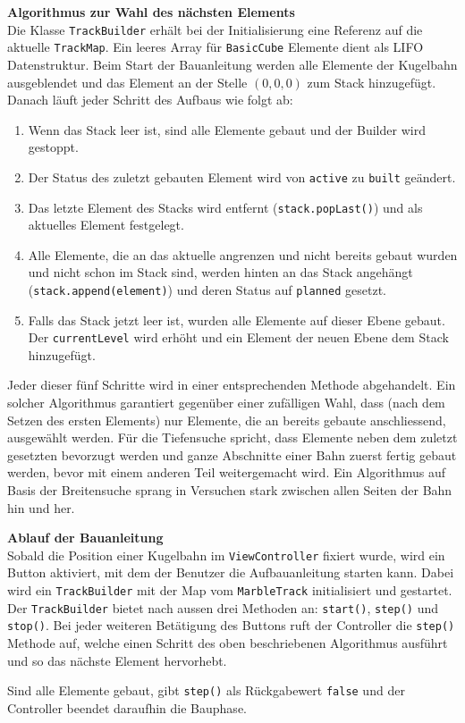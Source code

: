 \begin{description}
	\textbf{Algorithmus zur Wahl des nächsten Elements}\\
	Die Klasse \texttt{TrackBuilder} erhält bei der Initialisierung eine Referenz auf die aktuelle \texttt{TrackMap}. Ein leeres Array für \texttt{BasicCube} Elemente dient als LIFO Datenstruktur. Beim Start der Bauanleitung werden alle Elemente der Kugelbahn ausgeblendet und das Element an der Stelle $(0,0,0)$ zum Stack hinzugefügt. Danach läuft jeder Schritt des Aufbaus wie folgt ab:
	\begin{enumerate}
		\item Wenn das Stack leer ist, sind alle Elemente gebaut und der Builder wird gestoppt.
		\item Der Status des zuletzt gebauten Element wird von \texttt{active} zu \texttt{built} geändert.
		\item Das letzte Element des Stacks wird entfernt (\texttt{stack.popLast()}) und als aktuelles Element festgelegt.
		\item Alle Elemente, die an das aktuelle angrenzen und nicht bereits gebaut wurden und nicht schon im Stack sind, werden hinten an das Stack angehängt (\texttt{stack.append(element)}) und deren Status auf \texttt{planned} gesetzt.
		\item Falls das Stack jetzt leer ist, wurden alle Elemente auf dieser Ebene gebaut. Der \texttt{currentLevel} wird erhöht und ein Element der neuen Ebene dem Stack hinzugefügt.
	\end{enumerate}

	Jeder dieser fünf Schritte wird in einer entsprechenden Methode abgehandelt. Ein solcher Algorithmus garantiert gegenüber einer zufälligen Wahl, dass (nach dem Setzen des ersten Elements) nur Elemente, die an bereits gebaute anschliessend, ausgewählt werden. Für die Tiefensuche spricht, dass Elemente neben dem zuletzt gesetzten bevorzugt werden und ganze Abschnitte einer Bahn zuerst fertig gebaut werden, bevor mit einem anderen Teil weitergemacht wird. Ein Algorithmus auf Basis der Breitensuche sprang in Versuchen stark zwischen allen Seiten der Bahn hin und her.

	\textbf{Ablauf der Bauanleitung}\\
	Sobald die Position einer Kugelbahn im \texttt{ViewController} fixiert wurde, wird ein Button aktiviert, mit dem der Benutzer die Aufbauanleitung starten kann. Dabei wird ein \texttt{TrackBuilder} mit der Map vom \texttt{MarbleTrack} initialisiert und gestartet. Der \texttt{TrackBuilder} bietet nach aussen drei Methoden an: \texttt{start()}, \texttt{step()} und \texttt{stop()}. Bei jeder weiteren Betätigung des Buttons ruft der Controller die \texttt{step()} Methode auf, welche einen Schritt des oben beschriebenen Algorithmus ausführt und so das nächste Element hervorhebt.

	Sind alle Elemente gebaut, gibt \texttt{step()} als Rückgabewert \texttt{false} und der Controller beendet daraufhin die Bauphase.
\end{description}
